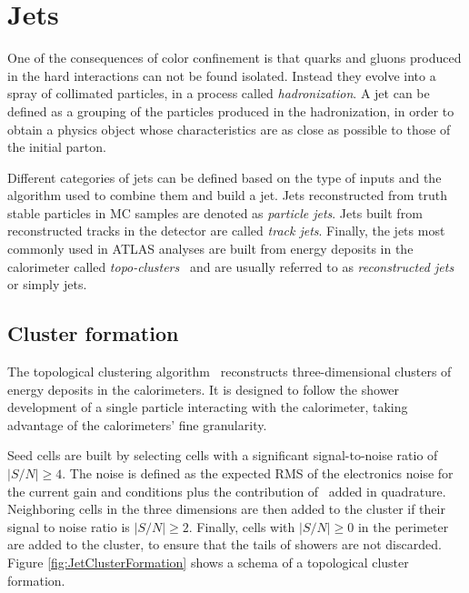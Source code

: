 \section{Jets}
    \label{sec:JetReco}

    One of the consequences of color confinement is that quarks and gluons produced in the hard interactions can not be found isolated.
    Instead they evolve into a spray of collimated particles, in a process called \textit{hadronization}.
    A jet can be defined as a grouping of the particles produced in the hadronization, in order to obtain a physics object whose characteristics are as close as possible to those of the initial parton.

    Different categories of jets can be defined based on the type of inputs and the algorithm used to combine them and build a jet. 
Jets reconstructed from truth stable particles in MC samples are denoted as \textit{particle jets}. Jets built from 
reconstructed tracks in the detector are called \textit{track jets}. %
Finally, the jets most commonly used in ATLAS analyses are built from energy deposits in the calorimeter called \textit{topo-clusters}~\cite{Lampl:2008zz} and are usually referred to as \textit{reconstructed jets} or simply jets.

\subsection{Cluster formation}
    \label{subsec:JetClusterFormation}

The topological clustering algorithm~\cite{Lampl:2008zz} reconstructs three-dimensional clusters of energy deposits in the calorimeters. It is designed to follow the shower development of a single particle interacting with the calorimeter, taking advantage of the calorimeters' fine granularity.

Seed cells are built by selecting cells with a significant signal-to-noise ratio of $|S/N|\geq 4$.
The noise is defined as the expected RMS of the electronics noise for the current gain and conditions plus the contribution of \pileup\ added in quadrature.
Neighboring cells in the three dimensions are then added to the cluster if their signal to noise ratio is $|S/N|\geq 2$.
Finally, cells with $|S/N|\geq 0$ in the perimeter are added to the cluster, to ensure that the tails of showers are not discarded.
Figure \ref{fig:JetClusterFormation} shows a schema of a topological cluster formation.

